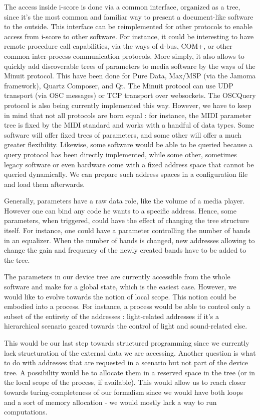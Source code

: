 \documentclass{sigchi}
\begin{document}
The access inside i-score is done via a common interface, organized as a tree, since it's the most common and familiar way to present a document-like software to the outside.
This interface can be reimplemented for other protocols to enable access from i-score to other software. For instance, it could be interesting to have remote procedure call capabilities, via the ways of d-bus, COM+, or other common inter-process communication protocols. More simply, it also allows to quickly add discoverable trees of parameters to media software by the ways of the Minuit %
protocol. This have been done for Pure Data, Max/MSP (via the Jamoma framework), Quartz Composer, and Qt. The Minuit protocol can use UDP transport (via OSC messages) or TCP transport over websockets. The OSCQuery %
protocol is also being currently implemented this way. However, we have to keep in mind that not all protocols are born equal : for instance, the MIDI parameter tree is fixed by the MIDI standard and works with a handful of data types. Some software will offer fixed trees of parameters, and some other will offer a much greater flexibility. Likewise, some software would be able to be queried because a query protocol has been directly implemented, while some other, sometimes legacy software or even hardware come with a fixed address space that cannot be queried dynamically. We can prepare such address spaces in a configuration file and load them afterwards.

Generally, parameters have a raw data role, like the volume of a media player. However one can bind any code he wants to a specific address. Hence, some parameters, when triggered, could have the effect of changing the tree structure itself. For instance, one could have a parameter controlling the number of bands in an equalizer. When the number of bands is changed, new addresses allowing to change the gain and frequency of the newly created bands have to be added to the tree.

The parameters in our device tree are currently accessible from the whole software and make for a global state, which is the easiest case. However, we would like to evolve towards the notion of local scope. This notion could be embodied into a process. For instance, a process would be able to control only a subset of the entirety of the addresses : light-related addresses if it's a hierarchical scenario geared towards the control of light and sound-related else.  

This would be our last step towards structured programming since we currently lack structuration of the external data we are accessing. Another question is what to do with addresses that are requested in a scenario but not part of the device tree. A possibility would be to allocate them in a reserved space in the tree (or in the local scope of the process, if available). This would allow us to reach closer towards turing-completeness of our formalism since we would have both loops and a sort of memory allocation - we would mostly lack a way to run computations.
\end{document}
